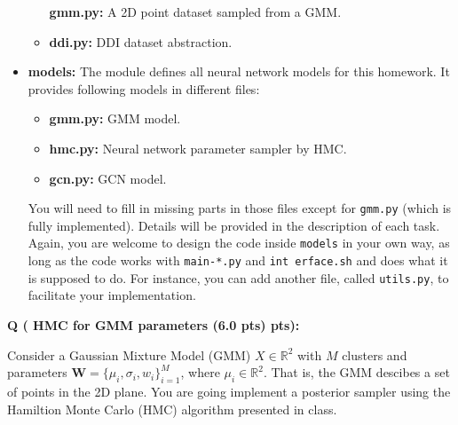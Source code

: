 \documentclass{article}
\newcommand{\mW}{\bm{W}}
\newcounter{questionno}
\newcounter{partno}
\newcommand{\question}[1]{
    \noindent
    \newline
    \stepcounter{questionno}
    \setcounter{partno}{0}
    {\bf Q\arabic{questionno} (#1 pts):}
}
\begin{document}
\begin{itemize}
\begin{itemize}
        \textbf{gmm.py:} A 2D point dataset sampled from a GMM.
    \item
        \textbf{ddi.py:} DDI dataset abstraction.
    \end{itemize}
%
\item
    \textbf{models:}
    The module defines all neural network models for this homework.
    It provides following models in different files:
    \begin{itemize}
    \item
        \textbf{gmm.py:} GMM model.
    \item
        \textbf{hmc.py:} Neural network parameter sampler by HMC.
    \item
        \textbf{gcn.py:} GCN model.
    \end{itemize}
    You will need to fill in missing parts in those files except for
    \texttt{gmm.py} (which is fully implemented).
    Details will be provided in the description of each task.
    Again, you are welcome to design the code inside \texttt{models} in your
    own way, as long as the code works with \texttt{main-*.py} and \texttt{int%
    erface.sh} and does what it is supposed to do.
    For instance, you can add another file, called \texttt{utils.py}, to
    facilitate your implementation.
%
\end{itemize}



\newpage
%
\question{%
    HMC for GMM parameters (6.0 pts)
}

%
\hfill

%
\noindent
%
Consider a Gaussian Mixture Model (GMM) $X \in \mathbb{R}^2$ with $M$ clusters and parameters $\mW = \{\mu_{i}, \sigma_{i}, w_{i}\}_{i = 1}^{M}$, where $\mu_{i} \in \mathbb{R}^2$.
That is, the GMM descibes a set of points in the 2D plane.
You are going implement a posterior sampler using the Hamiltion Monte Carlo (HMC) algorithm presented in class.
\end{document}
